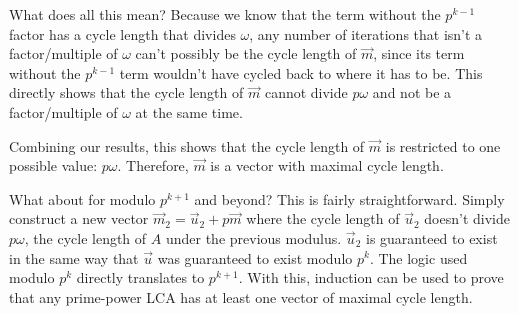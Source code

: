 \documentclass[a4paper, reqno, 12pt]{amsart}
\begin{document}
		What does all this mean? Because we know that the term without the $p^{k-1}$ factor has a cycle length that divides $\omega$, any number of iterations that
		isn't a factor/multiple of $\omega$ can't possibly be the cycle length of $\vec{m}$, since its term without the $p^{k-1}$ term wouldn't have cycled back to
		where it has to be. This directly shows that the cycle length of $\vec{m}$ cannot divide $p\omega$ and not be a factor/multiple of $\omega$ at the same time.
		
		Combining our results, this shows that the cycle length of $\vec{m}$ is restricted to one possible value: $p\omega$. Therefore, $\vec{m}$ is a vector with
		maximal cycle length.
		
		What about for modulo $p^{k+1}$ and beyond? This is fairly straightforward. Simply construct a new vector $\vec{m}_2 = \vec{u}_2 + p\vec{m}$ where the
		cycle length of $\vec{u}_2$ doesn't divide $p\omega$, the cycle length of $A$ under the previous modulus. $\vec{u}_2$ is guaranteed to exist in the same
		way that $\vec{u}$ was guaranteed to exist modulo $p^k$. The logic used modulo $p^k$ directly translates to $p^{k+1}$. With this, induction can be used
		to prove that any prime-power LCA has at least one vector of maximal cycle length.
		
	
	
\end{document}
